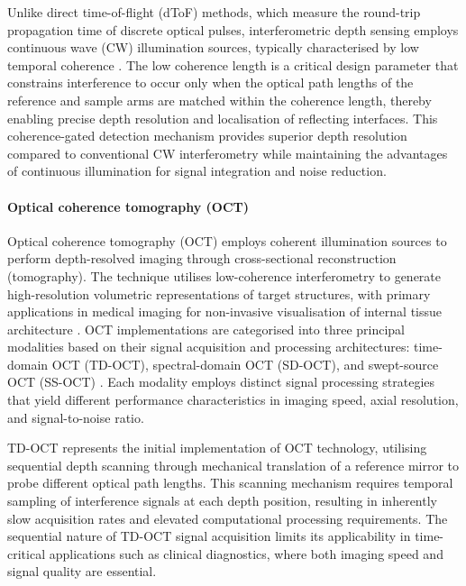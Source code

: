 \documentclass[12pt,a4paper,oneside]{report}
\begin{document}
Unlike direct time-of-flight (dToF) methods, which measure the round-trip propagation time of discrete optical pulses, interferometric depth sensing employs continuous wave (CW) illumination sources, typically characterised by low temporal coherence \cite{huang1991,aumann2019}. The low coherence length is a critical design parameter that constrains interference to occur only when the optical path lengths of the reference and sample arms are matched within the coherence length, thereby enabling precise depth resolution and localisation of reflecting interfaces. This coherence-gated detection mechanism provides superior depth resolution compared to conventional CW interferometry while maintaining the advantages of continuous illumination for signal integration and noise reduction.

\paragraph{Optical coherence tomography (OCT)}
\label{par:optical_coherence_tomography}

Optical coherence tomography (OCT) \cite{huang1991} employs coherent illumination sources to perform depth-resolved imaging through cross-sectional reconstruction (tomography). The technique utilises low-coherence interferometry to generate high-resolution volumetric representations of target structures, with primary applications in medical imaging for non-invasive visualisation of internal tissue architecture \cite{aumann2019}. OCT implementations are categorised into three principal modalities based on their signal acquisition and processing architectures: time-domain OCT (TD-OCT), spectral-domain OCT (SD-OCT), and swept-source OCT (SS-OCT) \cite{aumann2019}. Each modality employs distinct signal processing strategies that yield different performance characteristics in imaging speed, axial resolution, and signal-to-noise ratio.

TD-OCT represents the initial implementation of OCT technology, utilising sequential depth scanning through mechanical translation of a reference mirror to probe different optical path lengths. This scanning mechanism requires temporal sampling of interference signals at each depth position, resulting in inherently slow acquisition rates and elevated computational processing requirements. The sequential nature of TD-OCT signal acquisition limits its applicability in time-critical applications such as clinical diagnostics, where both imaging speed and signal quality are essential.
\end{document}
